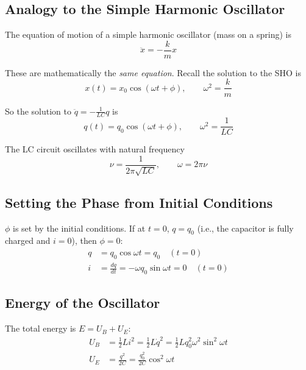 \documentclass[11pt]{report}
\begin{document}
\subsection{Analogy to the Simple Harmonic Oscillator}

The equation of motion of a simple harmonic oscillator (mass on a spring) is
\begin{equation}
\ddot{x} = -\frac{k}{m}x
\end{equation}

These are mathematically the \emph{same equation}. Recall the solution to the SHO is
\begin{equation}
x(t) = x_0 \cos(\omega t + \phi), \qquad \omega^2 = \frac{k}{m}
\end{equation}

So the solution to $\ddot{q} = -\frac{1}{LC}q$ is
\begin{equation}
\boxed{q(t) = q_0\cos(\omega t + \phi), \qquad \omega^2 = \frac{1}{LC}}
\end{equation}

The LC circuit oscillates with natural frequency
\begin{equation}
\boxed{\nu = \frac{1}{2\pi\sqrt{LC}}, \qquad \omega = 2\pi\nu}
\end{equation}

\subsection{Setting the Phase from Initial Conditions}

$\phi$ is set by the initial conditions. If at $t=0$, $q = q_0$ (i.e., the capacitor is fully charged and $i = 0$), then $\phi = 0$:
\begin{align}
q &= q_0\cos\omega t = q_0 \quad (t=0) \\
i &= \frac{dq}{dt} = -\omega q_0 \sin\omega t = 0 \quad (t=0)
\end{align}

\subsection{Energy of the Oscillator}

The total energy is $E = U_B + U_E$:
\begin{align}
U_B &= \tfrac{1}{2}Li^2 = \tfrac{1}{2}L\dot{q}^2 = \tfrac{1}{2}L q_0^2 \omega^2 \sin^2\omega t \\
U_E &= \frac{q^2}{2C} = \frac{q_0^2}{2C}\cos^2\omega t
\end{align}
\end{document}
